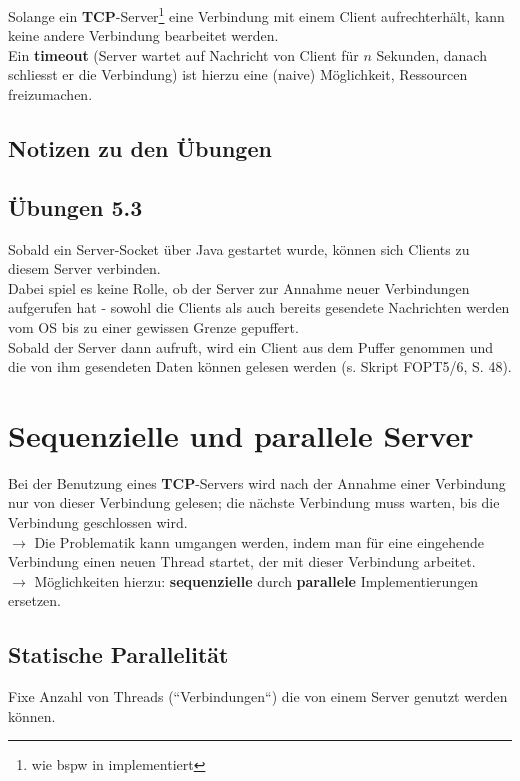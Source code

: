 \noindent
Solange ein \textbf{TCP}-Server\footnote{
 wie bspw in \cite[288, Listing 5.8]{Oec22} implementiert
} eine Verbindung mit einem Client aufrechterhält, kann keine andere Verbindung bearbeitet werden.\\
Ein \textbf{timeout} (Server wartet auf Nachricht von Client für $n$ Sekunden, danach schliesst er die Verbindung) ist hierzu eine (naive) Möglichkeit, Ressourcen freizumachen.

\subsection{Notizen zu den Übungen}
\subsection*{Übungen 5.3}
Sobald ein Server-Socket über Java gestartet wurde, können sich Clients zu diesem Server verbinden.\\
Dabei spiel es keine Rolle, ob der Server  zur Annahme neuer Verbindungen aufgerufen hat - sowohl die Clients als auch bereits gesendete Nachrichten werden vom OS bis zu einer gewissen Grenze gepuffert.\\
Sobald der Server dann  aufruft, wird ein Client aus dem Puffer genommen und die von ihm gesendeten Daten können gelesen werden (s. Skript FOPT5/6, S. 48).

\section{Sequenzielle und parallele Server}

Bei der Benutzung eines \textbf{TCP}-Servers wird nach der Annahme einer Verbindung nur von dieser Verbindung gelesen; die nächste Verbindung muss warten, bis die Verbindung geschlossen wird.\\
$\rightarrow$ Die Problematik kann umgangen werden, indem man für eine eingehende Verbindung einen neuen Thread startet, der mit dieser Verbindung arbeitet.\\

\noindent
$\rightarrow$ Möglichkeiten hierzu: \textbf{sequenzielle} durch \textbf{parallele} Implementierungen ersetzen.\\

\subsection*{Statische Parallelität}
Fixe Anzahl von Threads (``Verbindungen``) die von einem Server genutzt werden können.\\

